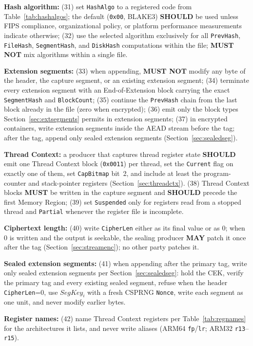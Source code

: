 \documentclass[11pt,a4paper]{article}
\newcommand{\MUST}{\textbf{MUST}}
\newcommand{\MUSTNOT}{\textbf{MUST NOT}}
\newcommand{\SHOULD}{\textbf{SHOULD}}
\newcommand{\MAY}{\textbf{MAY}}
\newcommand{\hex}[1]{\texttt{0x#1}}
\newcommand{\field}[1]{\texttt{#1}}
\begin{document}
\noindent\textbf{Hash algorithm:} (31) set \field{HashAlgo} to a registered code from Table~\ref{tab:hashalgos}; the default (\hex{00}, BLAKE3) \SHOULD{} be used unless FIPS compliance, organizational policy, or platform performance measurements indicate otherwise; (32) use the selected algorithm exclusively for all \field{PrevHash}, \field{FileHash}, \field{SegmentHash}, and \field{DiskHash} computations within the file; \MUSTNOT{} mix algorithms within a single file.

\noindent\textbf{Extension segments:} (33) when appending, \MUSTNOT{} modify any byte of the header, the capture segment, or an existing extension segment; (34) terminate every extension segment with an End-of-Extension block carrying the exact \field{SegmentHash} and \field{BlockCount}; (35) continue the \field{PrevHash} chain from the last block already in the file (zero when encrypted); (36) emit only the block types Section~\ref{sec:extsegments} permits in extension segments; (37) in encrypted containers, write extension segments inside the AEAD stream before the tag; after the tag, append only sealed extension segments (Section~\ref{sec:sealedseg}).

\noindent\textbf{Thread Context:} a producer that captures thread register state \SHOULD{} emit one Thread Context block (\hex{0011}) per thread, set the \field{Current} flag on exactly one of them, set \field{CapBitmap} bit~2, and include at least the program-counter and stack-pointer registers (Section~\ref{sec:threadctx}). (38) Thread Context blocks \MUST{} be written in the capture segment and \SHOULD{} precede the first Memory Region; (39) set \field{Suspended} only for registers read from a stopped thread and \field{Partial} whenever the register file is incomplete.

\noindent\textbf{Ciphertext length:} (40) write \field{CipherLen} either as its final value or as 0; when 0 is written and the output is seekable, the sealing producer \MAY{} patch it once after the tag (Section~\ref{sec:streamenc}); no other party patches it.

\noindent\textbf{Sealed extension segments:} (41) when appending after the primary tag, write only sealed extension segments per Section~\ref{sec:sealedseg}: hold the CEK, verify the primary tag and every existing sealed segment, refuse when the header \field{CipherLen}=0, use $\mathit{SegKey}_i$ with a fresh CSPRNG \field{Nonce}, write each segment as one unit, and never modify earlier bytes.

\noindent\textbf{Register names:} (42) name Thread Context registers per Table~\ref{tab:regnames} for the architectures it lists, and never write aliases (ARM64 \texttt{fp}/\texttt{lr}; ARM32 \texttt{r13}--\texttt{r15}).
\end{document}
